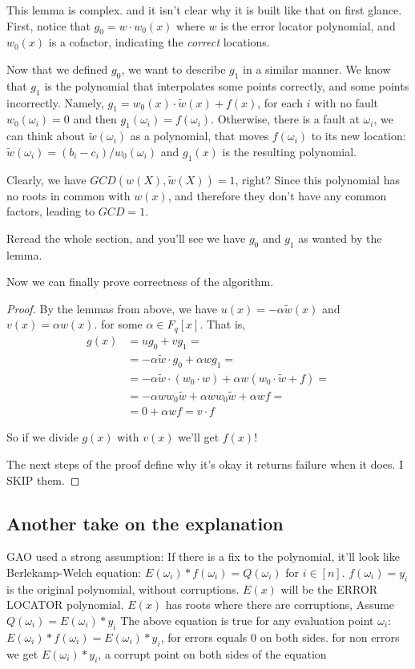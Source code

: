 This lemma is complex. and it isn't clear why it is built like that on first glance. 
First, notice that $g_0=w\cdot w_0(x)$ where $w$ is the error locator polynomial,
and $w_0(x)$ is a cofactor, indicating the \emph{correct} locations.

Now that we defined $g_0$, we want to describe $g_1$ 
in a similar manner. We know that $g_1$ is the polynomial that interpolates
some points correctly, and some points incorrectly.
Namely, $g_1=w_0(x)\cdot \tilde{w}(x)+f(x)$, for each $i$ with no fault $w_0(\omega_i)=0$
and then $g_1(\omega_i)=f(\omega_i)$. Otherwise, there is a fault at $\omega_i$, 
we can think about $\tilde{w}(\omega_i)$ as a polynomial,
that moves $f(\omega_i)$ to its new location:
$\tilde{w}(\omega_i)=(b_i-c_i)/w_0(\omega_i)$ and $g_1(x)$ is the resulting polynomial.

Clearly, we have $GCD(w(X),\tilde{w}(X))=1$, right? 
Since this polynomial has no roots in common with 
$w(x)$, and therefore they don't have any common
 factors, leading to $GCD=1$.

Reread the whole section, and you'll see we have $g_0$ and $g_1$ as wanted by the lemma.

Now we can finally prove correctness of the algorithm.
\begin{proof}
By the lemmas from above, we have 
$u(x)=-\alpha\tilde{w}(x)$ and $v(x)=\alpha w(x)$. for some $\alpha\in F_q[x]$.
That is, 
\begin{equation}
    \begin{split}
    g(x) & = u g_0+vg_1= \\
         & = -\alpha\tilde{w}\cdot g_0 + \alpha w g_1= \\
         & = -\alpha\tilde{w}\cdot (w_0 \cdot w) + \alpha w (w_0 \cdot \tilde{w}+f) = \\
         & = -\alpha w w_0 \tilde{w} + \alpha w w_0 \tilde{w} + \alpha w f = \\
         & = 0 + \alpha w f = v\cdot f
    \end{split}
\end{equation}

So if we divide $g(x)$ with $v(x)$ we'll get $f(x)$!

The next steps of the proof define why it's okay it returns failure when it does.
I SKIP them.
\end{proof}

\subsection{Another take on the explanation}
GAO used a strong assumption:
If there is a fix to the polynomial, it'll look like Berlekamp-Welch equation:
$E(\omega_i)*f(\omega_i) = Q(\omega_i)$ for $i\in[n]$.
$f(\omega_i)=y_i$ is the original polynomial, without corruptions.
$E(x)$ will be the ERROR LOCATOR polynomial. $E(x)$ has roots where there are corruptions,
Assume $Q(\omega_i)=E(\omega_i)*y_i$
The above equation is true for any evaluation point $\omega_i$:
$E(\omega_i)*f(\omega_i)= E(\omega_i) * y_i$, for errors equals $0$ on both sides.
for non errors we get $E(\omega_i) *y_i$, a corrupt point on both sides of the equation

